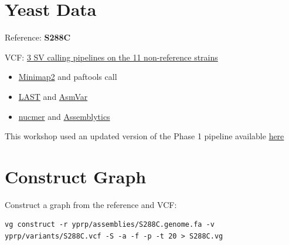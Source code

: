\documentclass[
]{book}
\providecommand{\tightlist}{%
  \setlength{\itemsep}{0pt}\setlength{\parskip}{0pt}}
\begin{document}
\hypertarget{yeast-data}{%
\section{Yeast Data}\label{yeast-data}}

Reference: \textbf{S288C}

VCF: \href{https://link.springer.com/article/10.1186/s13059-020-1941-7}{3 SV calling pipelines on the 11 non-reference strains}

\begin{itemize}
\tightlist
\item
  \href{https://github.com/lh3/minimap2}{Minimap2} and paftools call
\item
  \href{https://last.cbrc.jp}{LAST} and \href{https://github.com/bioinformatics-centre/AsmVar}{AsmVar}
\item
  \href{https://github.com/mummer4/mummer}{nucmer} and \href{https://github.com/marianattestad/assemblytics}{Assemblytics}
\end{itemize}

This workshop used an updated version of the Phase 1 pipeline available \href{https://github.com/alancleary/sv-genotyping-paper/tree/master/yeast\#1-prepare-yeast-assemblies-and-call-svs-relative-to-the-reference-strain-s288c}{here}

\hypertarget{construct-graph}{%
\section{Construct Graph}\label{construct-graph}}

Construct a graph from the reference and VCF:

\begin{verbatim}
vg construct -r yprp/assemblies/S288C.genome.fa -v yprp/variants/S288C.vcf -S -a -f -p -t 20 > S288C.vg
\end{verbatim}
\end{document}
